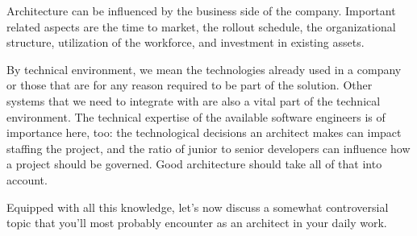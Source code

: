 Architecture can be influenced by the business side of the company. Important related aspects are the time to market, the rollout schedule, the organizational structure, utilization of the workforce, and investment in existing assets.

By technical environment, we mean the technologies already used in a company or those that are for any reason required to be part of the solution. Other systems that we need to integrate with are also a vital part of the technical environment. The technical expertise of the available software engineers is of importance here, too: the technological decisions an architect makes can impact staffing the project, and the ratio of junior to senior developers can influence how a project should be governed. Good architecture should take all of that into account.

Equipped with all this knowledge, let's now discuss a somewhat controversial topic that you'll most probably encounter as an architect in your daily work.















